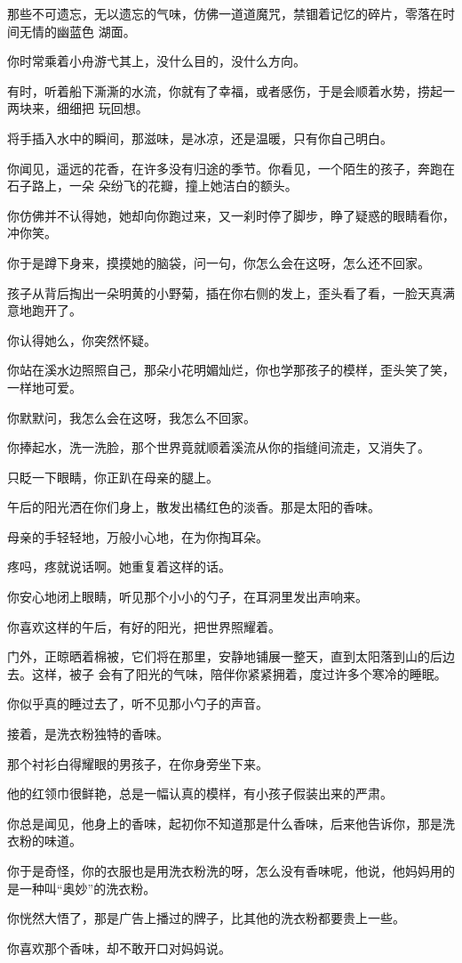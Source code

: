 		那些不可遗忘，无以遗忘的气味，仿佛一道道魔咒，禁锢着记忆的碎片，零落在时间无情的幽蓝色
	湖面。

		你时常乘着小舟游弋其上，没什么目的，没什么方向。

		有时，听着船下澌澌的水流，你就有了幸福，或者感伤，于是会顺着水势，捞起一两块来，细细把
	玩回想。

		将手插入水中的瞬间，那滋味，是冰凉，还是温暖，只有你自己明白。

		\vspace{1em}
		你闻见，遥远的花香，在许多没有归途的季节。你看见，一个陌生的孩子，奔跑在石子路上，一朵
	朵纷飞的花瓣，撞上她洁白的额头。

		你仿佛并不认得她，她却向你跑过来，又一刹时停了脚步，睁了疑惑的眼睛看你，冲你笑。\par
		你于是蹲下身来，摸摸她的脑袋，问一句，你怎么会在这呀，怎么还不回家。\par
		孩子从背后掏出一朵明黄的小野菊，插在你右侧的发上，歪头看了看，一脸天真满意地跑开了。\par
		你认得她么，你突然怀疑。\par
		你站在溪水边照照自己，那朵小花明媚灿烂，你也学那孩子的模样，歪头笑了笑，一样地可爱。\par
		你默默问，我怎么会在这呀，我怎么不回家。\par
		你捧起水，洗一洗脸，那个世界竟就顺着溪流从你的指缝间流走，又消失了。

		\vspace{1em}
		只眨一下眼睛，你正趴在母亲的腿上。\par
		午后的阳光洒在你们身上，散发出橘红色的淡香。那是太阳的香味。\par
		母亲的手轻轻地，万般小心地，在为你掏耳朵。\par
		疼吗，疼就说话啊。她重复着这样的话。\par
		你安心地闭上眼睛，听见那个小小的勺子，在耳洞里发出声响来。\par
		你喜欢这样的午后，有好的阳光，把世界照耀着。

		门外，正晾晒着棉被，它们将在那里，安静地铺展一整天，直到太阳落到山的后边去。这样，被子
	会有了阳光的气味，陪伴你紧紧拥着，度过许多个寒冷的睡眠。

		你似乎真的睡过去了，听不见那小勺子的声音。\par
		接着，是洗衣粉独特的香味。

		\vspace{1em}
		那个衬衫白得耀眼的男孩子，在你身旁坐下来。\par
		他的红领巾很鲜艳，总是一幅认真的模样，有小孩子假装出来的严肃。\par
		你总是闻见，他身上的香味，起初你不知道那是什么香味，后来他告诉你，那是洗衣粉的味道。\par
		你于是奇怪，你的衣服也是用洗衣粉洗的呀，怎么没有香味呢，他说，他妈妈用的是一种叫“奥妙”的洗衣粉。\par
		你恍然大悟了，那是广告上播过的牌子，比其他的洗衣粉都要贵上一些。\par
		你喜欢那个香味，却不敢开口对妈妈说。

